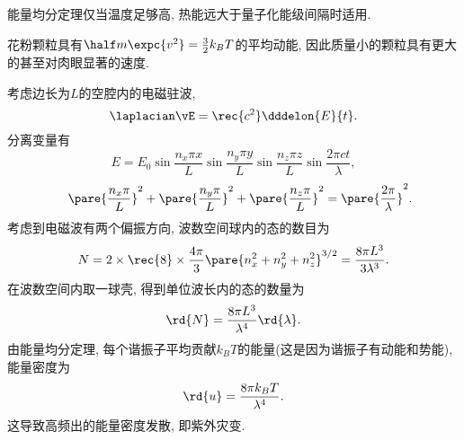 \documentclass[../Thermal.tex]{subfiles}
\begin{document}
\begin{pitfall}
能量均分定理仅当温度足够高, 热能远大于量子化能级间隔时适用.
\end{pitfall}
\begin{ex}[Brown运动]
花粉颗粒具有$\half m\expc{v^2}=\frac{3}{2}k_BT$的平均动能, 因此质量小的颗粒具有更大的甚至对肉眼显著的速度.
\end{ex}
\begin{ex}
考虑边长为$L$的空腔内的电磁驻波,
\[ \laplacian \vE = \rec{c^2}\dddelon{E}{t}. \]
分离变量有
\[ E = E_0\sin\frac{n_x\pi x}{L}\sin\frac{n_y\pi y}{L}\sin\frac{n_z\pi z}{L}\sin\frac{2\pi ct}{\lambda}, \]
\[ \quad \pare{\frac{n_x\pi}{L}}^2+\pare{\frac{n_y\pi}{L}}^2+\pare{\frac{n_z\pi}{L}}^2 = \pare{\frac{2\pi}{\lambda}}^2. \]
考虑到电磁波有两个偏振方向, 波数空间球内的态的数目为
\[ N = 2\times\rec{8}\times\frac{4\pi}{3}\pare{n_x^2+n_y^2+n_z^2}^{3/2} = \frac{8\pi L^3}{3\lambda^3}. \]
在波数空间内取一球壳, 得到单位波长内的态的数量为
\[ \rd{N} = \frac{8\pi L^3}{\lambda^4}\rd{\lambda}. \]
由能量均分定理, 每个谐振子平均贡献$k_BT$的能量(这是因为谐振子有动能和势能), 能量密度为
\begin{equation}
\label{eq:rayleighjeans}
\rd{u} = \frac{8\pi k_B T}{\lambda^4}.
\end{equation}
这导致高频出的能量密度发散, 即紫外灾变.
\end{ex}
\end{document}
